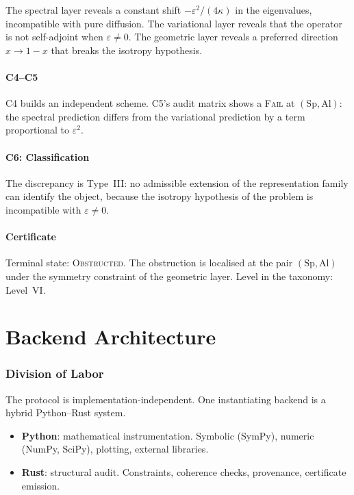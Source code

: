 \documentclass[11pt,a4paper]{article}
\theoremstyle{definition}
\theoremstyle{plain}
\newcommand{\Sp}{\mathrm{Sp}}
\newcommand{\Al}{\mathrm{Al}}
\newcommand{\STFAIL}{\textsc{Fail}}
\newcommand{\STOBSTR}{\textsc{Obstructed}}
\begin{document}
The spectral layer reveals a constant shift
$-\varepsilon^2/(4\kappa)$ in the eigenvalues, incompatible with
pure diffusion. The variational layer reveals that the operator is
not self-adjoint when $\varepsilon \neq 0$. The geometric layer
reveals a preferred direction $x \to 1-x$ that breaks the isotropy
hypothesis.

\subsection{C4--C5}

C4 builds an independent scheme. C5's audit matrix shows a
\STFAIL{} at $(\Sp, \Al)$: the spectral prediction differs from
the variational prediction by a term proportional to
$\varepsilon^2$.

\subsection{C6: Classification}

The discrepancy is Type~III: no admissible extension of the
representation family can identify the object, because the isotropy
hypothesis of the problem is incompatible with $\varepsilon \neq 0$.

\subsection{Certificate}

Terminal state: \STOBSTR. The obstruction is localised at the pair
$(\Sp, \Al)$ under the symmetry constraint of the geometric layer.
Level in the taxonomy: Level~VI.

\part{Backend Architecture}
\label{part:backend}

\section{Division of Labor}
\label{sec:backend-division}

The protocol is implementation-independent. One instantiating
backend is a hybrid Python--Rust system.

\begin{itemize}
  \item \textbf{Python}: mathematical instrumentation. Symbolic
        (SymPy), numeric (NumPy, SciPy), plotting, external
        libraries.
  \item \textbf{Rust}: structural audit. Constraints, coherence
        checks, provenance, certificate emission.
\end{itemize}
\end{document}
